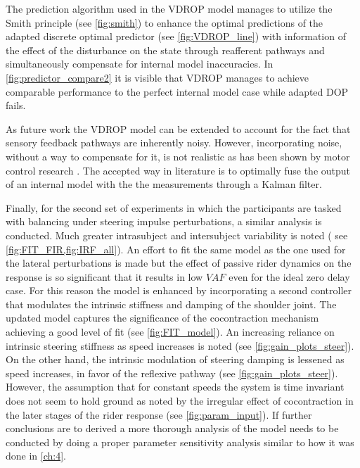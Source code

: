 The  prediction algorithm used in the VDROP model  manages to utilize the Smith  principle (see \cref{fig:smith}) to enhance the optimal  predictions of the adapted discrete optimal predictor (see \cref{fig:VDROP_line}) with  information of the effect of the disturbance on the state through reafferent pathways and simultaneously compensate for internal model inaccuracies. In \cref{fig:predictor_compare2} it is visible that VDROP manages to achieve comparable performance to the perfect internal model case while adapted DOP fails. 
 
As future work the VDROP model can be extended to account for the fact that sensory feedback pathways are inherently noisy. However, incorporating noise,  without a way to compensate for it, is not realistic as has been shown by motor control research \cite{wolpert1995internal}. The accepted way in literature is to optimally fuse the output of an internal model with the the measurements through a Kalman filter. 
 
Finally, for the second set of experiments in which the participants are tasked with balancing under steering impulse perturbations, a similar analysis is conducted. Much greater intrasubject and intersubject variability is noted ( see \cref{fig:FIT_FIR,fig:IRF_all}). An effort to fit the same model as the one used for the lateral perturbations is made but the effect of passive rider dynamics on the response is so significant that it results in low \ensuremath{\mathit{VAF}} even for the ideal zero delay case. For this reason the model is enhanced by incorporating a second controller that modulates the intrinsic stiffness and damping of the shoulder joint. The updated model captures the significance of the cocontraction mechanism achieving a good level of fit (see \cref{fig:FIT_model}). An increasing reliance on intrinsic steering stiffness as speed increases is noted (see \cref{fig:gain_plots_steer}). On the other hand, the intrinsic modulation of steering damping is lessened as speed increases, in favor of the reflexive pathway (see \cref{fig:gain_plots_steer}). However, the assumption that for constant speeds the system is time invariant does not seem to hold ground as noted by the irregular effect of cocontraction in the later stages of the rider  response (see \cref{fig:param_input}). If further conclusions are to derived a more thorough analysis of the model needs to be conducted by doing a proper parameter sensitivity analysis similar to how it was done in \cref{ch:4}.
 
